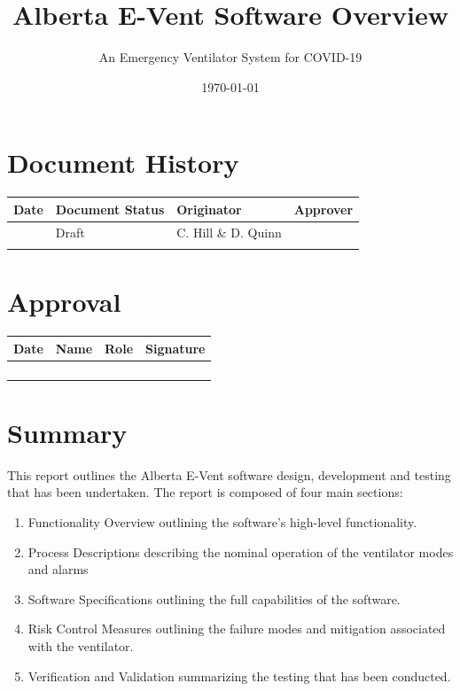 \documentclass[]{article}
\title{Alberta E-Vent Software Overview}
\author{An Emergency Ventilator System for COVID-19}
\begin{document}
	


\maketitle

\newpage

\section*{Document History}
\begin{center}
	\begin{tabular}{ |p{3cm}| p{3cm}| p{3cm}| p{3cm}|}
		\hline
		Date & Document Status & Originator & Approver \\
		\hline 
		 \date{\today} & Draft & C. Hill \& D. Quinn &  \\  
		\hline
		 &   &  & \\ 
		 \hline
	\end{tabular}
\end{center}

\section*{Approval}

\begin{center}
	\begin{tabular}{ |p{3cm}| p{3cm}| p{3cm}| p{3cm}|}
		\hline
		Date & Name & Role & Signature \\
		\hline 
		& &  &  \\  [2ex]
		\hline
		&   &  & \\ [2ex]
		\hline 
		&   &  & \\ [2ex]
		\hline   
		&   &  & \\ [2ex]
		\hline     
	\end{tabular}
\end{center}


\clearpage

\tableofcontents

\clearpage


\section{Summary}

This report outlines the Alberta E-Vent software design, development and testing that has been undertaken.  The report is composed of four main sections:
\begin{enumerate}
	\item Functionality Overview outlining the software's high-level functionality.
	\item Process Descriptions describing the nominal operation of the ventilator modes and alarms
	\item Software Specifications outlining the full capabilities of the software.
	\item Risk Control Measures outlining the failure modes and mitigation associated with the ventilator.
	\item Verification and Validation summarizing the testing that has been conducted.
\end{enumerate}
\end{document}
